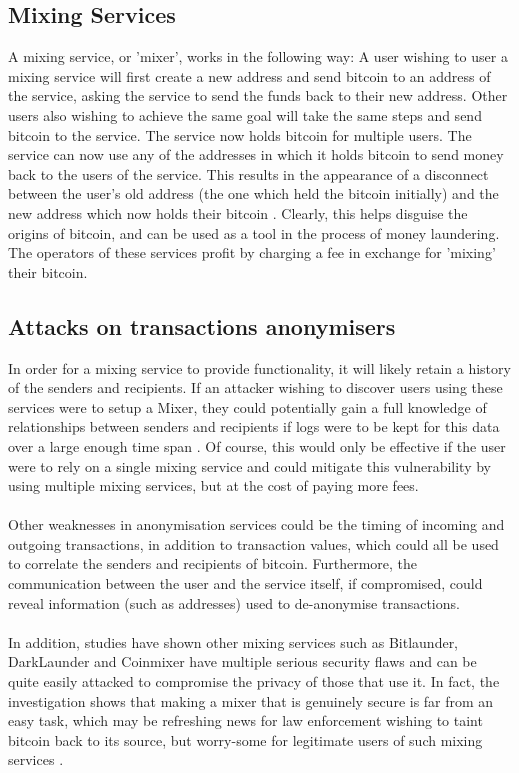 \subsection{Mixing Services}
A mixing service, or 'mixer', works in the following way: A user wishing to user a mixing service will first create a new address and send bitcoin to an address of the service, asking the service to send the funds back to their new address. Other users also wishing to achieve the same goal will take the same steps and send bitcoin to the service. The service now holds bitcoin for multiple users. The service can now use any of the addresses in which it holds bitcoin to send money back to the users of the service. This results in the appearance of a disconnect between the user's old address (the one which held the bitcoin initially) and the new address which now holds their bitcoin \cite{RefWorks:doc:5c3dace5e4b0613d0cda512b}. Clearly, this helps disguise the origins of bitcoin, and can be used as a tool in the process of money laundering. The operators of these services profit by charging a fee in exchange for 'mixing' their bitcoin. 

\subsection{Attacks on transactions anonymisers}
In order for a mixing service to provide functionality, it will likely retain a history of the senders and recipients. If an attacker wishing to discover users using these services were to setup a Mixer, they could potentially gain a full knowledge of relationships between senders and recipients if logs were to be kept for this data over a large enough time span \cite{RefWorks:doc:5c3dace5e4b0613d0cda512b}. Of course, this would only be effective if the user were to rely on a single mixing service and could mitigate this vulnerability by using multiple mixing services, but at the cost of paying more fees. 
\\\\
Other weaknesses in anonymisation services could be the timing of incoming and outgoing transactions, in addition to transaction values, which could all be used to correlate the senders and recipients of bitcoin. Furthermore, the communication between the user and the service itself, if compromised, could reveal information (such as addresses) used to de-anonymise transactions. 
\\\\
In addition, studies have shown other mixing services such as Bitlaunder, DarkLaunder and Coinmixer have multiple serious security flaws and can be quite easily attacked to compromise the privacy of those that use it. In fact, the investigation shows that making a mixer that is genuinely secure is far from an easy task, which may be refreshing news for law enforcement wishing to taint bitcoin back to its source, but worry-some for legitimate users of such mixing services \cite{RefWorks:doc:5c3db214e4b0854ae6124c26}. 



